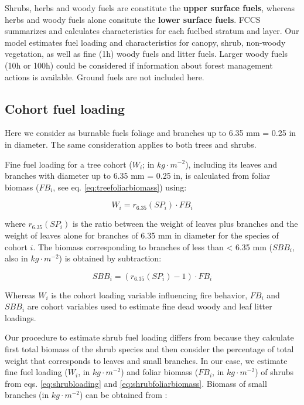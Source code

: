 \documentclass[]{book}
\begin{document}
Shrubs, herbs and woody fuels are constitute the \textbf{upper surface
fuels}, whereas herbs and woody fuels alone consitute the \textbf{lower
surface fuels}. FCCS summarizes and calculates characteristics for each
fuelbed stratum and layer. Our model estimates fuel loading and
characteristics for canopy, shrub, non-woody vegetation, as well as fine
(1h) woody fuels and litter fuels. Larger woody fuels (10h or 100h)
could be considered if information about forest management actions is
available. Ground fuels are not included here.

\subsection{Cohort fuel loading}\label{cohort-fuel-loading}

Here we consider as burnable fuels foliage and branches up to 6.35 mm =
0.25 in in diameter. The same consideration applies to both trees and
shrubs.

Fine fuel loading for a tree cohort (\(W_{i}\); in \(kg\cdot m^{-2}\)),
including its leaves and branches with diameter up to 6.35 mm = 0.25 in,
is calculated from foliar biomass (\(FB_{i}\), see eq.
\eqref{eq:treefoliarbiomass}) using:

\begin{equation}
W_{i} = r_{6.35}(SP_i)\cdot FB_{i}
\end{equation}

where \(r_{6.35}(SP_i)\) is the ratio between the weight of leaves plus
branches and the weight of leaves alone for branches of 6.35 mm in
diameter for the species of cohort \(i\). The biomass corresponding to
branches of less than \textless{} 6.35 mm (\(SBB_{i}\), also in
\(kg\cdot m^{-2}\)) is obtained by subtraction:

\begin{equation}
SBB_{i} = (r_{6.35}(SP_i)-1)\cdot FB_{i}
\end{equation}

Whereas \(W_{i}\) is the cohort loading variable influencing fire
behavior, \(FB_{i}\) and \(SBB_{i}\) are cohort variables used to
estimate fine dead woody and leaf litter loadings.

Our procedure to estimate shrub fuel loading differs from
\citet{Prichard2013} because they calculate first total biomass of the
shrub species and then consider the percentage of total weight that
corresponds to leaves and small branches. In our case, we estimate fine
fuel loading (\(W_{i}\), in \(kg \cdot m^{-2}\)) and foliar biomass
(\(FB_i\), in \(kg \cdot m^{-2}\)) of shrubs from eqs.
\eqref{eq:shrubloading} and \eqref{eq:shrubfoliarbiomass}. Biomass of small
branches (in \(kg \cdot m^{-2}\)) can be obtained from :
\end{document}
